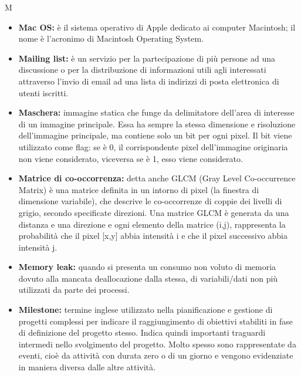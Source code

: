 \Huge M
\normalsize
\begin{itemize}
\item\textbf{Mac OS:} è il sistema operativo di Apple dedicato ai computer Macintosh; il nome è l'acronimo di Macintosh Operating System.

\item\textbf{Mailing list:} è un servizio per la partecipazione di più persone ad una discussione o per la distribuzione di informazioni utili agli interessati attraverso l'invio di email ad una lista di indirizzi di posta elettronica di utenti iscritti.

\item\textbf{Maschera:} immagine statica che funge da delimitatore dell'area di interesse di un immagine principale. Essa ha sempre la stessa dimensione e risoluzione dell'immagine principale, ma contiene solo un bit per ogni pixel\glossario{}. Il bit viene utilizzato come flag: se è 0, il corrispondente pixel\glossario{} dell'immagine originaria non viene considerato, viceversa se è 1, esso viene considerato.

\item\textbf{Matrice di co-occorrenza:} detta anche GLCM (Gray Level Co-occurrence Matrix) è una matrice definita in un intorno di pixel\glossario{} (la finestra di dimensione variabile), che descrive le co-occorrenze di coppie dei livelli di grigio, secondo specificate direzioni. Una matrice GLCM è generata da una distanza e una direzione e ogni elemento della matrice (i,j), rappresenta la probabilità che il pixel [x,y] abbia intensità i e che il pixel successivo abbia intensità j.

\item \textbf{Memory leak:} quando si presenta un consumo non voluto di memoria dovuto alla mancata deallocazione dalla stessa, di variabili/dati non più utilizzati da parte dei processi.

\item \textbf{Milestone:} termine inglese utilizzato nella pianificazione e gestione di progetti complessi per indicare il raggiungimento di obiettivi stabiliti in fase di definizione del progetto stesso. Indica quindi importanti traguardi intermedi nello svolgimento del progetto. Molto spesso sono rappresentate da eventi, cioè da attività con durata zero o di un giorno e vengono evidenziate in maniera diversa dalle altre attività.


\end{itemize}

